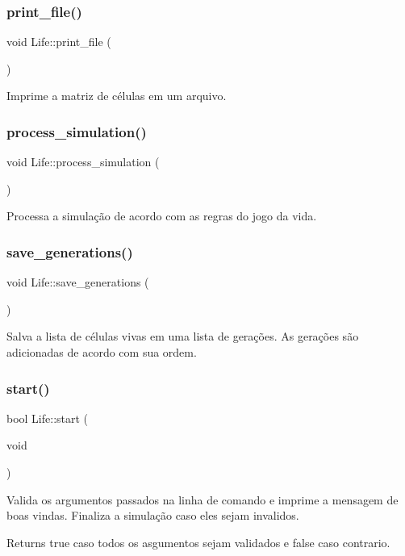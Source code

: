 \subsubsection{print\+\_\+file()}
{\footnotesize\ttfamily void Life\+::print\+\_\+file (\begin{DoxyParamCaption}{ }\end{DoxyParamCaption})}

Imprime a matriz de células em um arquivo. \mbox{\label{class_life_a81e831a5bb2c598aebdb03677d38652f}} 
\subsubsection{process\+\_\+simulation()}
{\footnotesize\ttfamily void Life\+::process\+\_\+simulation (\begin{DoxyParamCaption}{ }\end{DoxyParamCaption})}

Processa a simulação de acordo com as regras do jogo da vida. \mbox{\label{class_life_a59ad6fe5f50a3ae34c6c2ac204d78d71}} 
\subsubsection{save\+\_\+generations()}
{\footnotesize\ttfamily void Life\+::save\+\_\+generations (\begin{DoxyParamCaption}{ }\end{DoxyParamCaption})}

Salva a lista de células vivas em uma lista de gerações. As gerações são adicionadas de acordo com sua ordem. \mbox{\label{class_life_ad81f7d9486741c90b9e38f5f3216f322}} 
\subsubsection{start()}
{\footnotesize\ttfamily bool Life\+::start (\begin{DoxyParamCaption}\item[{void}]{ }\end{DoxyParamCaption})}

Valida os argumentos passados na linha de comando e imprime a mensagem de boas vindas. Finaliza a simulação caso eles sejam invalidos. \begin{DoxyReturn}{Returns}
true caso todos os asgumentos sejam validados e false caso contrario. 
\end{DoxyReturn}
\mbox{\label{class_life_a015b3c5474f1834d5fbc61636a14bf09}} 
